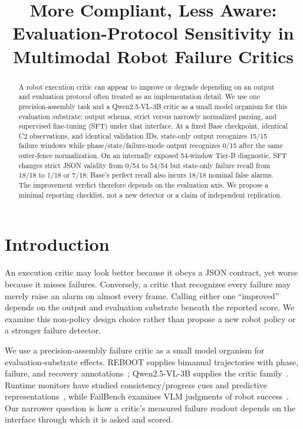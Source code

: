 \documentclass{article}
\title{More Compliant, Less Aware:\\Evaluation-Protocol Sensitivity in Multimodal Robot Failure Critics}
\author{}
\begin{document}
\maketitle

\begin{abstract}
A robot execution critic can appear to improve or degrade depending on an output and evaluation protocol often treated as an implementation detail. We use one precision-assembly task and a Qwen2.5-VL-3B critic as a small model organism for this evaluation substrate: output schema, strict versus narrowly normalized parsing, and supervised fine-tuning (SFT) under that interface. At a fixed Base checkpoint, identical C2 observations, and identical validation IDs, state-only output recognizes 15/15 failure windows while phase/state/failure-mode output recognizes 0/15 after the same outer-fence normalization. On an internally exposed 54-window Tier-B diagnostic, SFT changes strict JSON validity from 0/54 to 54/54 but state-only failure recall from 18/18 to 1/18 or 7/18; Base's perfect recall also incurs 18/18 nominal false alarms. The improvement verdict therefore depends on the evaluation axis. We propose a minimal reporting checklist, not a new detector or a claim of independent replication.
\end{abstract}

\section{Introduction}
An execution critic may look better because it obeys a JSON contract, yet worse because it misses failures. Conversely, a critic that recognizes every failure may merely raise an alarm on almost every frame. Calling either one ``improved'' depends on the output and evaluation substrate beneath the reported score. We examine this non-policy design choice rather than propose a new robot policy or a stronger failure detector.

We use a precision-assembly failure critic as a small model organism for evaluation-substrate effects. REBOOT supplies bimanual trajectories with phase, failure, and recovery annotations~\citep{reboot2026}; Qwen2.5-VL-3B supplies the critic family~\citep{qwen2025}. Runtime monitors have studied consistency/progress cues and predictive representations~\citep{sentinel2025,robomonitor2026}, while FailBench examines VLM judgments of robot success~\citep{failbench2026}. Our narrower question is how a critic's measured failure readout depends on the interface through which it is asked and scored.
\end{document}
